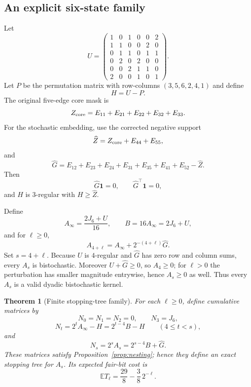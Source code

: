 \documentclass[11pt]{article}
\newtheorem{theorem}{Theorem}[section]
\theoremstyle{definition}
\newcommand{\one}{\mathbf 1}
\begin{document}
\subsection{An explicit six-state family}

Let
\[
U=
\begin{pmatrix}
1&0&1&0&0&2\\
1&1&0&0&2&0\\
0&1&1&0&1&1\\
0&2&0&2&0&0\\
0&0&2&1&1&0\\
2&0&0&1&0&1
\end{pmatrix}.
\]
Let $P$ be the permutation matrix with row-columns $(3,5,6,2,4,1)$ and define
\[
H=U-P.
\]
The original five-edge core mask is
\[
Z_{\rm core}
=
E_{11}+E_{21}+E_{22}+E_{32}+E_{33}.
\]
For the stochastic embedding, use the corrected negative support
\[
\widehat Z
=
Z_{\rm core}+E_{44}+E_{55},
\]
and
\[
\widehat G
=
E_{12}+E_{23}+E_{24}+E_{31}+E_{35}+E_{41}+E_{52}
-
\widehat Z.
\]
Then
\[
\widehat G\one=0,
\qquad
\widehat G^\top\one=0,
\]
and $H$ is $3$-regular with $H\ge\widehat Z$.

Define
\[
A_\infty=\frac{2J_6+U}{16},
\qquad
B=16A_\infty=2J_6+U,
\]
and for $\ell\ge0$,
\[
A_{4+\ell}
=
A_\infty+2^{-(4+\ell)}\widehat G.
\]
Set $s=4+\ell$.
Because $U$ is $4$-regular and $\widehat G$ has zero row and column sums, every $A_s$ is
bistochastic.  Moreover $U+\widehat G\ge0$, so $A_4\ge0$; for $\ell>0$ the perturbation has
smaller magnitude entrywise, hence $A_s\ge0$ as well.  Thus every $A_s$ is a valid dyadic
bistochastic kernel.

\begin{theorem}[Finite stopping-tree family]
\label{thm:finite-tree}
For each $\ell\ge0$, define cumulative matrices by
\[
N_0=N_1=N_2=0,
\qquad
N_3=J_6,
\]
\[
N_t=2^tA_\infty-H=2^{t-4}B-H
\qquad(4\le t<s),
\]
and
\[
N_s=2^sA_s=2^{s-4}B+\widehat G.
\]
These matrices satisfy Proposition~\ref{prop:nesting}; hence they define an exact stopping tree for
$A_s$.  Its expected fair-bit cost is
\[
\mathbb E T_\ell
=
\frac{29}{8}-\frac38\,2^{-\ell}.
\]
\end{theorem}
\end{document}
